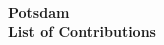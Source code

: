 \documentclass[%
  a4paper,
  pagesize,%
  1headlines,%
  8pt,%
  DIV=16,
  BCOR=12mm,
  twoside,
  smallheadings,
]{scrartcl}
\begin{document}
\sloppy

\thispagestyle{empty}
\begin{center}
\unilogo\\
\Huge\bf Potsdam\\ List of Contributions \\
\end{center}


\end{document}
